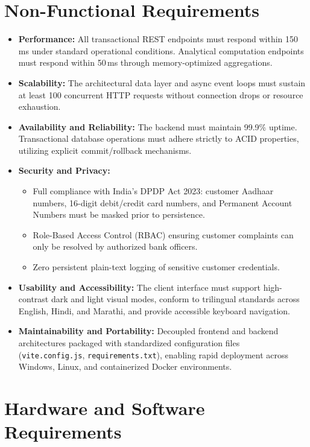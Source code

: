 \section{Non-Functional Requirements}
\begin{itemize}
    \item \textbf{Performance:} All transactional REST endpoints must respond within 150\,ms under standard operational conditions. Analytical computation endpoints must respond within 50\,ms through memory-optimized aggregations.
    \item \textbf{Scalability:} The architectural data layer and async event loops must sustain at least 100 concurrent HTTP requests without connection drops or resource exhaustion.
    \item \textbf{Availability and Reliability:} The backend must maintain 99.9\% uptime. Transactional database operations must adhere strictly to ACID properties, utilizing explicit commit/rollback mechanisms.
    \item \textbf{Security and Privacy:}
    \begin{itemize}
        \item Full compliance with India's DPDP Act 2023: customer Aadhaar numbers, 16-digit debit/credit card numbers, and Permanent Account Numbers must be masked prior to persistence.
        \item Role-Based Access Control (RBAC) ensuring customer complaints can only be resolved by authorized bank officers.
        \item Zero persistent plain-text logging of sensitive customer credentials.
    \end{itemize}
    \item \textbf{Usability and Accessibility:} The client interface must support high-contrast dark and light visual modes, conform to trilingual standards across English, Hindi, and Marathi, and provide accessible keyboard navigation.
    \item \textbf{Maintainability and Portability:} Decoupled frontend and backend architectures packaged with standardized configuration files (\texttt{vite.config.js}, \texttt{requirements.txt}), enabling rapid deployment across Windows, Linux, and containerized Docker environments.
\end{itemize}

\section{Hardware and Software Requirements}
